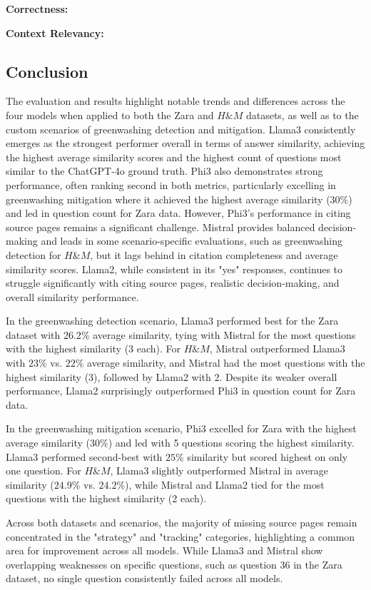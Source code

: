 \documentclass[]{article}
\begin{document}
\textbf{Correctness:}

\textbf{Context Relevancy:}

\subsection{Conclusion}
The evaluation and results highlight notable trends and differences across the four models when applied to both the Zara and $H\&M$ datasets, 
as well as to the custom scenarios of greenwashing detection and mitigation.
Llama3 consistently emerges as the strongest performer overall in terms of answer similarity, 
achieving the highest average similarity scores and the highest count of questions most similar to the ChatGPT-4o ground truth.
Phi3 also demonstrates strong performance, often ranking second in both metrics, particularly excelling in greenwashing mitigation where it achieved the highest average similarity ($30\%$) and led in question count for Zara data. 
However, Phi3’s performance in citing source pages remains a significant challenge. Mistral provides balanced decision-making and leads in some scenario-specific evaluations,
such as greenwashing detection for $H\&M$, but it lags behind in citation completeness and average similarity scores. Llama2, while consistent in its "yes" responses, continues to struggle significantly with citing source pages, realistic decision-making, and overall similarity performance.

In the greenwashing detection scenario, Llama3 performed best for the Zara dataset with $26.2\%$ average similarity, tying with Mistral for the most questions with the highest similarity (3 each). For $H\&M$, Mistral outperformed Llama3 with $23\%$ vs. $22\%$ average similarity, 
and Mistral had the most questions with the highest similarity (3), followed by Llama2 with 2. Despite its weaker overall performance, Llama2 surprisingly outperformed Phi3 in question count for Zara data.

In the greenwashing mitigation scenario, Phi3 excelled for Zara with the highest average similarity ($30\%$) and led with 5 questions scoring the highest similarity. Llama3 performed second-best with $25\%$ similarity but scored highest on only one question. 
For $H\&M$, Llama3 slightly outperformed Mistral in average similarity ($24.9\%$ vs. $24.2\%$), while Mistral and Llama2 tied for the most questions with the highest similarity (2 each).

Across both datasets and scenarios, the majority of missing source pages remain concentrated in the "strategy" and "tracking" categories, highlighting a common area for improvement across all models. 
While Llama3 and Mistral show overlapping weaknesses on specific questions, such as question 36 in the Zara dataset, no single question consistently failed across all models.
\end{document}
